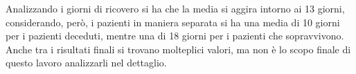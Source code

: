 Analizzando i giorni di ricovero si ha che la media si aggira intorno ai 13 giorni,  considerando, però, i pazienti in maniera separata  si ha una media di 10 giorni per i pazienti deceduti, mentre una di 18 giorni per i pazienti che sopravvivono.
Anche tra i risultati finali si trovano molteplici valori, ma non è lo scopo finale di questo lavoro analizzarli nel dettaglio.

